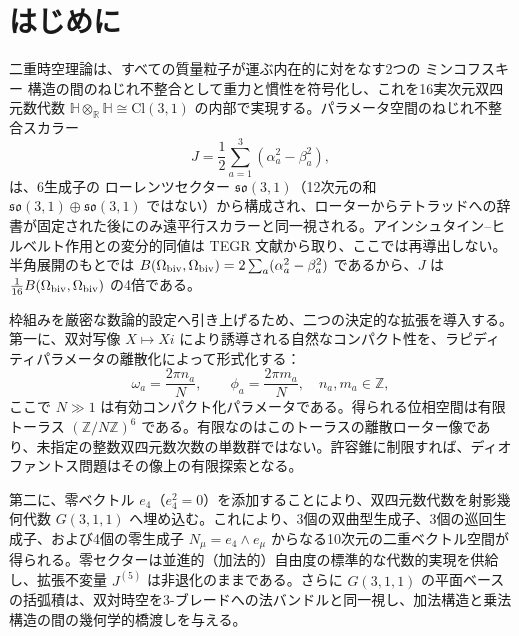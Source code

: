 \documentclass[a4paper]{article}
\theoremstyle{definition}
\theoremstyle{remark}
\begin{document}
\begin{abstract}
本枠組みは連続極限 \(N \to \infty\) において一般相対性理論の遠平行等価理論（TEGR）を正確に回復する一方、離散構造は数論的基礎と、特異点および発散を除去する自然な紫外カットオフの双方を供給する。したがって同一の代数的対象が、追加の場、次元、あるいは量子化の要請なしに算術と重力を統一する。

本理論は具体的な物理的含意をもたらす。離散的な重力波エコー、各コンパクト化 \(N\) における有限個の許容核ローター類、および核エネルギー準位への離散的なねじれ補正である。数値的カットオフ \(A_* \lesssim 300\) は未導出の発見的主張であり、定理ではない。

この再定式化において、時空は離散的、粒子局所的、かつ二重時間的である。重力は、各質量粒子が運ぶ内在的な双対時空の間のねじれ不整合として再解釈される。
\end{abstract}

\section{はじめに}

二重時空理論は、すべての質量粒子が運ぶ内在的に対をなす2つの ミンコフスキー 構造の間のねじれ不整合として重力と慣性を符号化し、これを16実次元双四元数代数 \(\mathbb{H} \otimes_{\mathbb{R}} \mathbb{H} \cong \mathrm{Cl}(3,1)\) の内部で実現する。パラメータ空間のねじれ不整合スカラー
\[
J = \frac12\sum_{a=1}^3(\alpha_a^2-\beta_a^2),
\]
は、6生成子の ローレンツセクター \(\mathfrak{so}(3,1)\)（12次元の和 \(\mathfrak{so}(3,1)\oplus\mathfrak{so}(3,1)\) ではない）から構成され、ローターからテトラッドへの辞書が固定された後にのみ遠平行スカラーと同一視される。アインシュタイン--ヒルベルト作用との変分的同値は TEGR 文献から取り、ここでは再導出しない。半角展開のもとでは \(B(\Omega_{\rm biv},\Omega_{\rm biv})=2\sum_a(\alpha_a^2-\beta_a^2)\) であるから、\(J\) は \(\frac1{16}B(\Omega_{\rm biv},\Omega_{\rm biv})\) の4倍である。

枠組みを厳密な数論的設定へ引き上げるため、二つの決定的な拡張を導入する。第一に、双対写像 \(X \mapsto Xi\) により誘導される自然なコンパクト性を、ラピディティパラメータの離散化によって形式化する：
\[
\omega_a = \frac{2\pi n_a}{N}, \qquad \phi_a = \frac{2\pi m_a}{N}, \quad n_a,m_a \in \mathbb{Z},
\]
ここで \(N \gg 1\) は有効コンパクト化パラメータである。得られる位相空間は有限トーラス \((\mathbb{Z}/N\mathbb{Z})^6\) である。有限なのはこのトーラスの離散ローター像であり、未指定の整数双四元数次数の単数群ではない。許容錐に制限すれば、ディオファントス問題はその像上の有限探索となる。

第二に、零ベクトル \(e_4\)（\(e_4^2 = 0\)）を添加することにより、双四元数代数を射影幾何代数 \(G(3,1,1)\) へ埋め込む。これにより、3個の双曲型生成子、3個の巡回生成子、および4個の零生成子 \(N_\mu = e_4 \wedge e_\mu\) からなる10次元の二重ベクトル空間が得られる。零セクターは並進的（加法的）自由度の標準的な代数的実現を供給し、拡張不変量 \(J^{(5)}\) は非退化のままである。さらに \(G(3,1,1)\) の平面ベースの括弧積は、双対時空を3-ブレードへの法バンドルと同一視し、加法構造と乗法構造の間の幾何学的橋渡しを与える。
\end{document}
